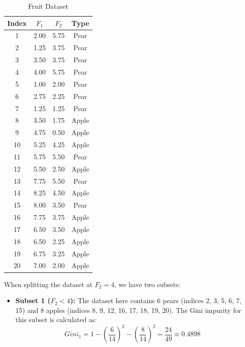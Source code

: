 \documentclass[12pt]{article}
\begin{document}
\begin{ejercicio}
        \begin{table}[h!]
        \centering
        \small
        \begin{tabular}{|c|c|c|c|}
        \hline
        \textbf{Index} & $F_1$ & $F_2$ & \textbf{Type} \\ \hline
        1 & 2.00 & 5.75 & Pear \\ \hline
        2 & 1.25 & 3.75 & Pear \\ \hline
        3 & 3.50 & 3.75 & Pear \\ \hline
        4 & 4.00 & 5.75 & Pear \\ \hline
        5 & 1.00 & 2.00 & Pear \\ \hline
        6 & 2.75 & 2.25 & Pear \\ \hline
        7 & 1.25 & 1.25 & Pear \\ \hline
        8 & 3.50 & 1.75 & Apple \\ \hline
        9 & 4.75 & 0.50 & Apple \\ \hline
        10 & 5.25 & 4.25 & Apple \\ \hline
        11 & 5.75 & 5.50 & Pear \\ \hline
        12 & 5.50 & 2.50 & Apple \\ \hline
        13 & 7.75 & 5.50 & Pear \\ \hline
        14 & 8.25 & 4.50 & Apple \\ \hline
        15 & 8.00 & 3.50 & Pear \\ \hline
        16 & 7.75 & 3.75 & Apple \\ \hline
        17 & 6.50 & 3.50 & Apple \\ \hline
        18 & 6.50 & 2.25 & Apple \\ \hline
        19 & 6.75 & 3.25 & Apple \\ \hline
        20 & 7.00 & 2.00 & Apple \\ \hline
        \end{tabular}
        \caption{Fruit Dataset}
        \label{tab:fruit_dataset2}
        \end{table}

        When splitting the dataset at $F_2 = 4$, we have two subsets:
        \begin{itemize}
            \item \textbf{Subset 1 ($F_2 < 4$):} The dataset here contains 6 pears (indices 2, 3, 5, 6, 7, 15) and 8 apples (indices 8, 9, 12, 16, 17, 18, 19, 20). The Gini impurity for this subset is calculated as:
            \begin{equation*}
                Gini_1 = 1 - \left(\frac{6}{14}\right)^2 - \left(\frac{8}{14}\right)^2 = \dfrac{24}{49} \approx 0.4898
            \end{equation*}


\end{itemize}
\end{ejercicio}
\end{document}
